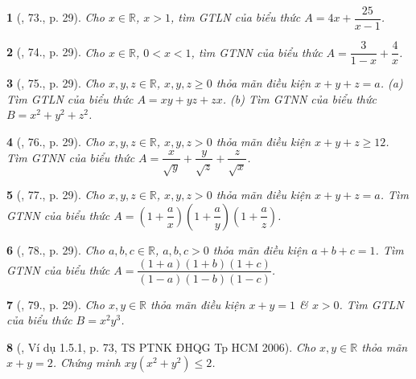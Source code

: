 \documentclass{article}
\newtheorem{baitoan}{}
\begin{document}
\begin{baitoan}[\cite{Tuyen_Toan_9}, 73., p. 29]
	Cho $x\in\mathbb{R}$, $x > 1$, tìm {\rm GTLN} của biểu thức $A = 4x + \dfrac{25}{x - 1}$.
\end{baitoan}

\begin{baitoan}[\cite{Tuyen_Toan_9}, 74., p. 29]
	Cho $x\in\mathbb{R}$, $0 < x < 1$, tìm {\rm GTNN} của biểu thức $A = \dfrac{3}{1 - x} + \dfrac{4}{x}$.
\end{baitoan}

\begin{baitoan}[\cite{Tuyen_Toan_9}, 75., p. 29]
	Cho $x,y,z\in\mathbb{R}$, $x,y,z\ge0$ thỏa mãn điều kiện $x + y + z = a$. (a) Tìm {\rm GTLN} của biểu thức $A = xy + yz + zx$. (b) Tìm {\rm GTNN} của biểu thức $B = x^2 + y^2 + z^2$.
\end{baitoan}

\begin{baitoan}[\cite{Tuyen_Toan_9}, 76., p. 29]
	Cho $x,y,z\in\mathbb{R}$, $x,y,z > 0$ thỏa mãn điều kiện $x + y + z\ge12$. Tìm {\rm GTNN} của biểu thức $A = \dfrac{x}{\sqrt{y}} + \dfrac{y}{\sqrt{z}} + \dfrac{z}{\sqrt{x}}$.
\end{baitoan}

\begin{baitoan}[\cite{Tuyen_Toan_9}, 77., p. 29]
	Cho $x,y,z\in\mathbb{R}$, $x,y,z > 0$ thỏa mãn điều kiện $x + y + z = a$. Tìm {\rm GTNN} của biểu thức $A = \left(1 + \dfrac{a}{x}\right)\left(1 + \dfrac{a}{y}\right)\left(1 + \dfrac{a}{z}\right)$.
\end{baitoan}

\begin{baitoan}[\cite{Tuyen_Toan_9}, 78., p. 29]
	Cho $a,b,c\in\mathbb{R}$, $a,b,c > 0$ thỏa mãn điều kiện $a + b + c = 1$. Tìm {\rm GTNN} của biểu thức $A = \dfrac{(1 + a)(1 + b)(1 + c)}{(1 - a)(1 - b)(1 - c)}$.
\end{baitoan}

\begin{baitoan}[\cite{Tuyen_Toan_9}, 79., p. 29]
	Cho $x,y\in\mathbb{R}$ thỏa mãn điều kiện $x + y = 1$ \& $x > 0$. Tìm {\rm GTLN} của biểu thức $B = x^2y^3$.
\end{baitoan}

\begin{baitoan}[\cite{Dung_Can_Anh_BDT_8_9}, Ví dụ 1.5.1, p. 73, TS PTNK ĐHQG Tp HCM 2006]
	Cho $x,y\in\mathbb{R}$ thỏa mãn $x + y = 2$. Chứng minh $xy(x^2 + y^2)\le2$.
\end{baitoan}
\end{document}
